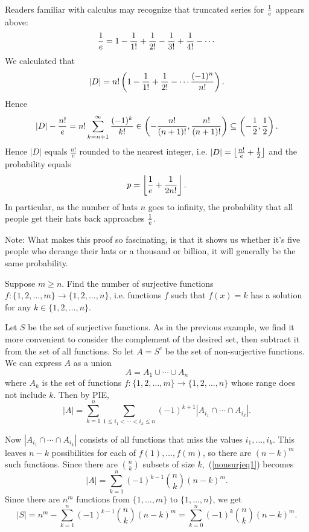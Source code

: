 Readers familiar with calculus may recognize that truncated series for $\frac{1}{e}$ appears above:
\[
\frac{1}{e}=1-\frac{1}{1!}+\frac{1}{2!}-\frac{1}{3!}+\frac{1}{4!}-\cdots 
\]
We calculated that
\[
|D|=n!\left( {1-\frac{1}{1!}+\frac{1}{2!}-\cdots \frac{(-1)^{n}}{n!}} \right).
\]
Hence
\[
|D|-\frac{n!}{e}=n!\sum_{k=n+1}^{\infty} \frac{(-1)^k}{k!}\in \left( {-\frac{n!}{(n+1)!},\frac{n!}{(n+1)!}} \right)\subseteq \left( {-\frac{1}{2},\frac{1}{2}} \right).
\]
Hence $|D|$ equals $\frac{n!}{e}$ rounded to the nearest integer, i.e. $|D|=\left\lfloor {\frac{n!}{e}+\frac{1}{2}}\right\rfloor$ and the probability equals
\[
p=\left\lfloor {\frac{1}{e}+\frac{1}{2n!}}\right\rfloor.
\]
In particular, as the number of hats $n$ goes to infinity, the probability that all people get their hats back approaches $\frac{1}{e}$.

Note: What makes this proof so fascinating, is that it shows us whether it's five people who derange their hats or a thousand or billion, it will generally be the same probability. 

\begin{ex}
Suppose $m\ge n$. Find the number of surjective functions $f:\{1,2,\ldots, m\}\to \{1,2,\ldots, n\}$, i.e. functions $f$ such that $f(x)=k$ has a solution for any $k\in \{1,2,\ldots, n\}$.
\end{ex}
Let $S$ be the set of surjective functions. 
As in the previous example, we find it more convenient to consider the complement of the desired set, then subtract it from the set of all functions. 
So let $A=S^c$ be the set of non-surjective functions.
We can express $A$ as a union
\[
A=A_1\cup \cdots \cup A_n
\]
where $A_k$ is the set of functions $f:\{1,2,\ldots, m\}\to \{1,2,\ldots, n\}$ whose range does not include $k$. Then by PIE,
\begin{equation}\label{nonsurjeq1}
|A|=\sum_{k=1}^{n}\sum_{1\le i_1<\cdots <i_k\le n} (-1)^{k+1} |A_{i_1}\cap \cdots \cap A_{i_k}|.
\end{equation}

Now $|A_{i_1}\cap \cdots \cap A_{i_k}|$ consists of all functions that miss the values $i_1,\ldots, i_k$. This leaves $n-k$ possibilities for each of $f(1),\ldots, f(m)$, so there are $(n-k)^m$ such functions. Since there are $\binom nk$ subsets of size $k$,~(\ref{nonsurjeq1}) becomes
\[
|A|=\sum_{k=1}^n (-1)^{k-1}\binom nk (n-k)^m.
\]
Since there are $n^m$ functions from $\{1,\ldots, m\}$ to $\{1,\ldots, n\}$, we get
\[
|S|=n^m-\sum_{k=1}^n (-1)^{k-1}\binom nk (n-k)^m
=\sum_{k=0}^n (-1)^{k}\binom nk (n-k)^m.
\]


